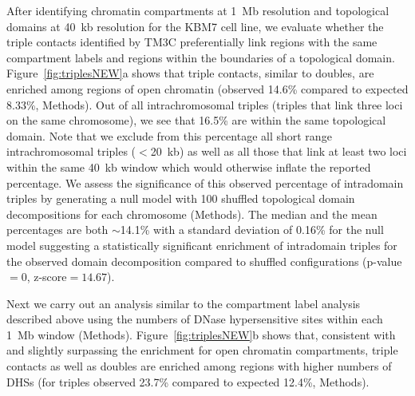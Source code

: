 After identifying chromatin compartments at 1~Mb resolution and topological domains
at 40~kb resolution for the KBM7 cell line,
we evaluate whether the triple contacts identified by TM3C preferentially link
regions with the same compartment labels and regions within the boundaries of a
topological domain. Figure~\ref{fig:triplesNEW}a shows that triple contacts,
similar to doubles, are enriched among regions of open chromatin
(observed 14.6\% compared to expected 8.33\%, Methods). Out of all intrachromosomal
triples (triples that link three loci on the same chromosome), we see that 16.5\%
are within the same topological domain. Note that we exclude from this percentage
all short range intrachromosomal triples ($<$20~kb) as well as all those that link
at least two loci within the same 40~kb window which would otherwise inflate the
reported percentage. We assess the significance of this observed percentage of
intradomain triples by generating a null model with 100 shuffled topological
domain decompositions for each chromosome (Methods). The median
and the mean percentages are both $\sim$14.1\% with a standard deviation of 0.16\%
for the null model suggesting a statistically significant enrichment of
intradomain triples for the observed domain decomposition compared to shuffled
configurations (p-value$=0$, z-score$=14.67$).

Next we carry out an analysis similar to the compartment label analysis
described above using the numbers of DNase hypersensitive sites within
each 1~Mb window (Methods). Figure~\ref{fig:triplesNEW}b shows that, consistent
with and slightly surpassing the enrichment for open chromatin compartments,
triple contacts as well as doubles are enriched among regions with higher
numbers of DHSs (for triples observed 23.7\% compared to expected 12.4\%, Methods).

